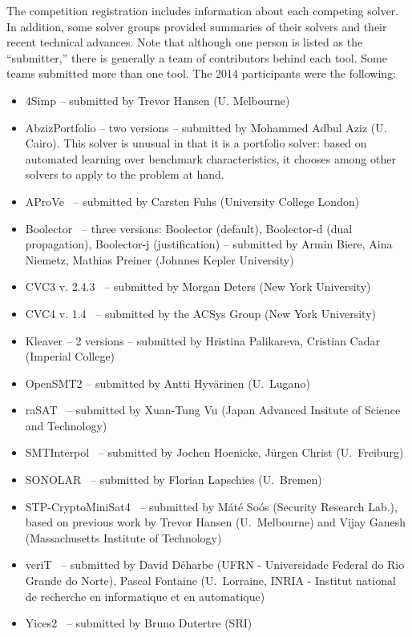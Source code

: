 \documentclass[twoside,11pt]{article}
\begin{document}
The competition registration includes information about each competing solver. In addition, some solver groups provided summaries of their solvers and their recent technical advances.
 Note that although one person is listed as the ``submitter,'' there is generally a team of contributors behind each tool. Some teams submitted more than one tool. The 2014 participants were the following:
\begin{itemize}
\item 4Simp -- submitted by Trevor Hansen (U. Melbourne)
\item AbzizPortfolio -- two versions -- submitted by Mohammed Adbul Aziz (U. Cairo). This solver is unusual in that it is a portfolio solver: based on automated learning over benchmark characteristics, it chooses among other solvers to apply to the problem at hand.
\item AProVe~\cite{AProVE2014} -- submitted by Carsten Fuhs (University College London)
\item Boolector~\cite{Boolector2015} -- three versions: Boolector (default),  Boolector-d (dual propagation), Boolector-j (justification) -- submitted by Armin Biere, Aina Niemetz, Mathias Preiner (Johnnes Kepler University)
\item CVC3 v. 2.4.3~\cite{BT07} -- submitted by Morgan Deters (New York University)
\item CVC4 v. 1.4~\cite{BCD+11} -- submitted by the ACSys Group (New York University)
\item Kleaver -- 2 versions -- submitted by Hristina Palikareva, Cristian Cadar (Imperial College)
\item OpenSMT2 -- submitted by Antti Hyv\"arinen (U.~Lugano)
\item raSAT~\cite{DBLP:conf/smt/KhanhVO14} -- submitted by Xuan-Tung Vu (Japan Advanced Insitute of Science and Technology)
\item SMTInterpol~\cite{DBLP:conf/spin/ChristHN12,DBLP:conf/spin/2012} -- submitted by Jochen Hoenicke, J\"urgen Christ (U.~Freiburg)
\item SONOLAR~\cite{Peleska:2011:ATC:1986308.1986333} -- submitted by Florian Lapschies (U.~Bremen)
\item STP-CryptoMiniSat4~\cite{DBLP:conf/cav/GaneshD07,DBLP:conf/cav/2007} -- submitted by M\'at\'e So\'os (Security Research Lab.), based on previous work by Trevor Hansen (U.~Melbourne) and Vijay Ganesh (Massachusetts Institute of Technology)
\item veriT~\cite{veriT} -- submitted by David D\'{e}harbe (UFRN - Universidade Federal do Rio Grande do Norte), Pascal Fontaine (U.~Lorraine, INRIA - Institut national de recherche en informatique et en automatique)
\item Yices2~\cite{Dutertre:cav2014} -- submitted by Bruno Dutertre (SRI)
\end{itemize}
\end{document}
